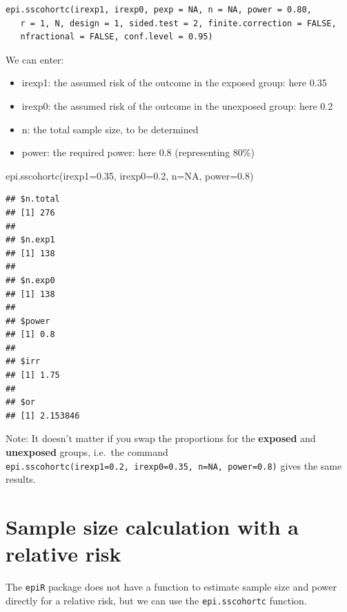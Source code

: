 \documentclass[
]{memoir}
\newenvironment{Shaded}{\begin{snugshade}}{\end{snugshade}}
\newcommand{\AttributeTok}[1]{\textcolor[rgb]{0.77,0.63,0.00}{#1}}
\newcommand{\ConstantTok}[1]{\textcolor[rgb]{0.00,0.00,0.00}{#1}}
\newcommand{\FloatTok}[1]{\textcolor[rgb]{0.00,0.00,0.81}{#1}}
\newcommand{\FunctionTok}[1]{\textcolor[rgb]{0.00,0.00,0.00}{#1}}
\newcommand{\NormalTok}[1]{#1}
\providecommand{\tightlist}{%
  \setlength{\itemsep}{0pt}\setlength{\parskip}{0pt}}
\begin{document}
\begin{verbatim}
epi.sscohortc(irexp1, irexp0, pexp = NA, n = NA, power = 0.80, 
   r = 1, N, design = 1, sided.test = 2, finite.correction = FALSE, 
   nfractional = FALSE, conf.level = 0.95)
\end{verbatim}

We can enter:

\begin{itemize}
\tightlist
\item
  irexp1: the assumed risk of the outcome in the exposed group: here 0.35
\item
  irexp0: the assumed risk of the outcome in the unexposed group: here 0.2
\item
  n: the total sample size, to be determined
\item
  power: the required power: here 0.8 (representing 80\%)
\end{itemize}

\begin{Shaded}
\begin{Highlighting}[]
\FunctionTok{epi.sscohortc}\NormalTok{(}\AttributeTok{irexp1=}\FloatTok{0.35}\NormalTok{, }\AttributeTok{irexp0=}\FloatTok{0.2}\NormalTok{, }\AttributeTok{n=}\ConstantTok{NA}\NormalTok{, }\AttributeTok{power=}\FloatTok{0.8}\NormalTok{) }
\end{Highlighting}
\end{Shaded}

\begin{verbatim}
## $n.total
## [1] 276
## 
## $n.exp1
## [1] 138
## 
## $n.exp0
## [1] 138
## 
## $power
## [1] 0.8
## 
## $irr
## [1] 1.75
## 
## $or
## [1] 2.153846
\end{verbatim}

Note: It doesn't matter if you swap the proportions for the \textbf{exposed} and \textbf{unexposed} groups, i.e.~the command \texttt{epi.sscohortc(irexp1=0.2,\ irexp0=0.35,\ n=NA,\ power=0.8)} gives the same results.

\hypertarget{sample-size-calculation-with-a-relative-risk}{%
\section{Sample size calculation with a relative risk}\label{sample-size-calculation-with-a-relative-risk}}

The \texttt{epiR} package does not have a function to estimate sample size and power directly for a relative risk, but we can use the \texttt{epi.sscohortc} function.
\end{document}
